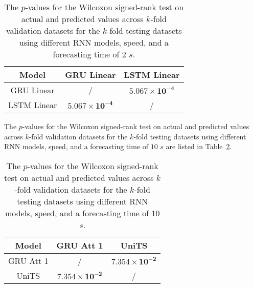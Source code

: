 \begin{table}[!ht]
	\centering
	\begin{tabular}{|c|c|c|}
		\hline
		Model & GRU Linear & LSTM Linear \\ \hline
		GRU Linear & / & $\mathbf{5.067 \times 10^{-4}}$ \\ \hline
		LSTM Linear & $\mathbf{5.067 \times 10^{-4}}$ & / \\ \hline
	\end{tabular}
	\caption{The $p$-values for the Wilcoxon signed-rank test on actual and predicted values across $k$-fold validation datasets for the $k$-fold testing datasets using different RNN models, speed, and a forecasting time of $2$ $s$.}
	\label{tab:speed:p:2}
\end{table}

The $p$-values for the Wilcoxon signed-rank test on actual and predicted values across $k$-fold validation datasets for the $k$-fold testing datasets using different RNN models, speed, and a forecasting time of $10$ $s$ are listed in Table~\ref{tab:speed:p:10}.

\begin{table}[!ht]
	\centering
	\begin{tabular}{|c|c|c|}
		\hline
		Model & GRU Att 1 & UniTS \\ \hline
		GRU Att 1 & / & $\mathbf{7.354 \times 10^{-2}}$ \\ \hline
		UniTS & $\mathbf{7.354 \times 10^{-2}}$ & / \\ \hline
	\end{tabular}
	\caption{The $p$-values for the Wilcoxon signed-rank test on actual and predicted values across $k$-fold validation datasets for the $k$-fold testing datasets using different RNN models, speed, and a forecasting time of $10$ $s$.}
	\label{tab:speed:p:10}
\end{table}

